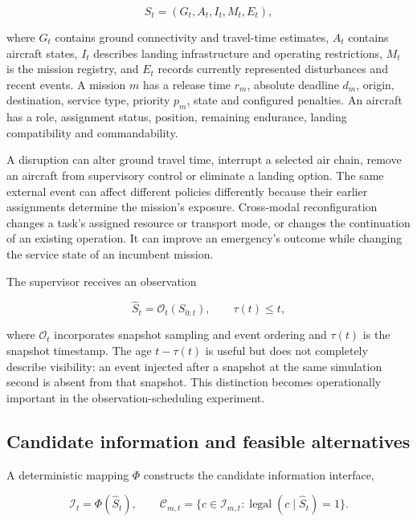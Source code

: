 \documentclass[]{interact}
\theoremstyle{plain}
\theoremstyle{definition}
\theoremstyle{remark}
\begin{document}
\begin{equation*}
S_t=(G_t,A_t,I_t,M_t,E_t), \tag{1}
\end{equation*}

where $G_t$ contains ground connectivity and travel-time estimates, $A_t$ contains aircraft states, $I_t$ describes landing infrastructure and operating restrictions, $M_t$ is the mission registry, and $E_t$ records currently represented disturbances and recent events. A mission $m$ has a release time $r_m$, absolute deadline $d_m$, origin, destination, service type, priority $p_m$, state and configured penalties. An aircraft has a role, assignment status, position, remaining endurance, landing compatibility and commandability.

A disruption can alter ground travel time, interrupt a selected air chain, remove an aircraft from supervisory control or eliminate a landing option. The same external event can affect different policies differently because their earlier assignments determine the mission's exposure. Cross-modal reconfiguration changes a task's assigned resource or transport mode, or changes the continuation of an existing operation. It can improve an emergency's outcome while changing the service state of an incumbent mission.

The supervisor receives an observation

\begin{equation*}
\widehat S_t=\mathcal O_t(S_{0:t}),\qquad \tau(t)\le t, \tag{2}
\end{equation*}

where $\mathcal O_t$ incorporates snapshot sampling and event ordering and $\tau(t)$ is the snapshot timestamp. The age $t-\tau(t)$ is useful but does not completely describe visibility: an event injected after a snapshot at the same simulation second is absent from that snapshot. This distinction becomes operationally important in the observation-scheduling experiment.

\subsection{Candidate information and feasible alternatives}

A deterministic mapping $\Phi$ constructs the candidate information interface,

\begin{equation*}
\mathcal I_t=\Phi(\widehat S_t),\qquad
\mathcal C_{m,t}=\{c\in\mathcal I_{m,t}:\operatorname{legal}(c\mid\widehat S_t)=1\}. \tag{3}
\end{equation*}
\end{document}
